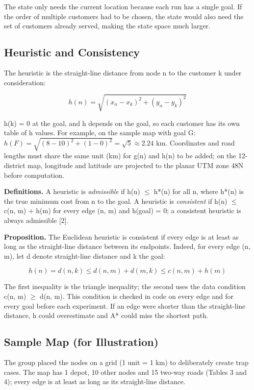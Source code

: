 \documentclass[12pt,a4paper]{article}
\begin{document}
The state only needs the current location because each run
has a single goal. If the order of multiple customers had to
be chosen, the state would also need the set of customers
already served, making the state space much larger.

\subsection{Heuristic and Consistency}

The heuristic is the straight-line distance from node n to
the customer k under consideration:

\[h(n) = \sqrt{(x_n - x_k)^2 + (y_n - y_k)^2}\]

h(k) = 0 at the goal, and h depends on the goal, so each
customer has its own table of h values. For example, on the
sample map with goal G:
\(h(F)=\sqrt{(8-10)^2+(1-0)^2}=\sqrt{5}\approx 2.24\) km.
Coordinates and road lengths must share the same unit (km)
for g(n) and h(n) to be added; on the 12-district map,
longitude and latitude are projected to the planar UTM zone
48N before computation.

\textbf{Definitions.} A heuristic is \emph{admissible} if
h(n) \(\le\) h*(n) for all n, where h*(n) is the true
minimum cost from n to the goal. A heuristic is
\emph{consistent} if h(n) \(\le\) c(n, m) + h(m) for every
edge (n, m) and h(goal) = 0; a consistent heuristic is
always admissible {[}2{]}.

\textbf{Proposition.} The Euclidean heuristic is consistent
if every edge is at least as long as the straight-line
distance between its endpoints. Indeed, for every edge (n,
m), let d denote straight-line distance and k the goal:

\[h(n) = d(n, k) \le d(n, m) + d(m, k) \le c(n, m) + h(m)\]

The first inequality is the triangle inequality; the second
uses the data condition c(n, m) \(\ge\) d(n, m). This
condition is checked in code on every edge and for every
goal before each experiment. If an edge were shorter than
the straight-line distance, h could overestimate and A*
could miss the shortest path.

\subsection{Sample Map (for Illustration)}

The group placed the nodes on a grid (1 unit = 1 km) to
deliberately create trap cases. The map has 1 depot, 10
other nodes and 15 two-way roads (Tables 3 and 4); every
edge is at least as long as its straight-line distance.
\end{document}
